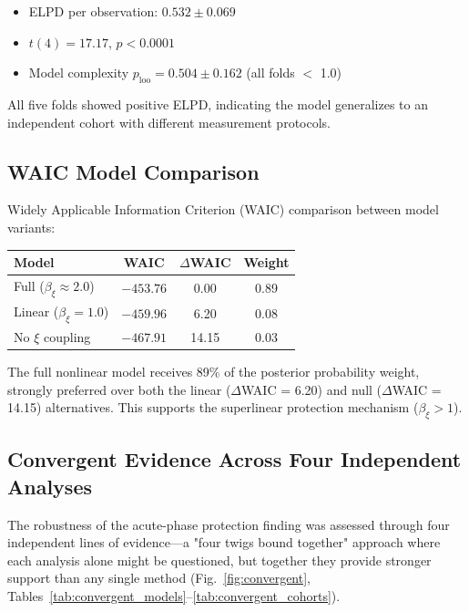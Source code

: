 \documentclass[10pt,a4paper]{article}
\begin{document}
\begin{itemize}
\item ELPD per observation: $0.532 \pm 0.069$
\item $t(4) = 17.17$, $p < 0.0001$
\item Model complexity $p_{\text{loo}} = 0.504 \pm 0.162$ (all folds $<$ 1.0)
\end{itemize}

All five folds showed positive ELPD, indicating the model generalizes to an independent cohort with different measurement protocols.

\subsection{WAIC Model Comparison}

Widely Applicable Information Criterion (WAIC) comparison between model variants:

\begin{center}
\begin{tabular}{lccc}
\toprule
\textbf{Model} & \textbf{WAIC} & \textbf{$\Delta$WAIC} & \textbf{Weight} \\
\midrule
Full ($\beta_\xi \approx 2.0$) & $-453.76$ & 0.00 & 0.89 \\
Linear ($\beta_\xi = 1.0$) & $-459.96$ & 6.20 & 0.08 \\
No $\xi$ coupling & $-467.91$ & 14.15 & 0.03 \\
\bottomrule
\end{tabular}
\end{center}

The full nonlinear model receives 89\% of the posterior probability weight, strongly preferred over both the linear ($\Delta$WAIC = 6.20) and null ($\Delta$WAIC = 14.15) alternatives. This supports the superlinear protection mechanism ($\beta_\xi > 1$).

\subsection{Convergent Evidence Across Four Independent Analyses}

The robustness of the acute-phase protection finding was assessed through four independent lines of evidence---a "four twigs bound together" approach where each analysis alone might be questioned, but together they provide stronger support than any single method (Fig.~\ref{fig:convergent}, Tables~\ref{tab:convergent_models}--\ref{tab:convergent_cohorts}).
\end{document}
